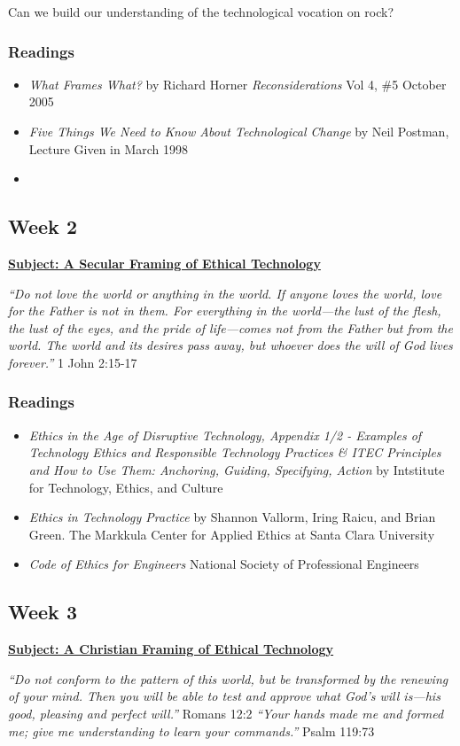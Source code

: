 \documentclass[11pt]{article}
\begin{document}
Can we build our understanding of the technological vocation on rock?
\subsubsection*{Readings}
\label{sec:org3d6a1fe}
\begin{itemize}
\item \emph{What Frames What?} by Richard Horner \emph{Reconsiderations} Vol 4, \#5 October
2005
\item \emph{Five Things We Need to Know About Technological Change} by Neil Postman,
Lecture Given in March 1998
\item 
\end{itemize}
\subsection*{Week 2}
\label{sec:org49e8ff0}
\textbf{\uline{Subject: A Secular Framing of Ethical Technology}}

\begin{mdframed}
\emph{``Do not love the world or anything in the world. If anyone loves the world,
love for the Father is not in them. For everything in the world—the lust
of the flesh, the lust of the eyes, and the pride of life—comes not from the
Father but from the world. The world and its desires pass away, but whoever
does the will of God lives forever.''} 1 John 2:15-17
\end{mdframed}
\subsubsection*{Readings}
\label{sec:orgb175c86}
\begin{itemize}
\item \emph{Ethics in the Age of Disruptive Technology, Appendix 1/2 - Examples of
Technology Ethics and Responsible Technology Practices \& ITEC Principles and
How to Use Them: Anchoring, Guiding, Specifying, Action} by Intstitute for
Technology, Ethics, and Culture
\item \emph{Ethics in Technology Practice} by Shannon Vallorm, Iring Raicu, and Brian
Green. The Markkula Center for Applied Ethics at Santa Clara University
\item \emph{Code of Ethics for Engineers} National Society of Professional Engineers
\end{itemize}
\subsection*{Week 3}
\label{sec:org192a243}
\textbf{\uline{Subject: A Christian Framing of Ethical Technology}}
\begin{mdframed}
\emph{``Do not conform to the pattern of this world, but be transformed by the
renewing of your mind. Then you will be able to test and approve what God’s will
is—his good, pleasing and perfect will.''} Romans 12:2 \newline
\noindent \emph{``Your hands made me and formed me; give me understanding to
learn your commands.''} Psalm 119:73
\end{mdframed}
\end{document}
